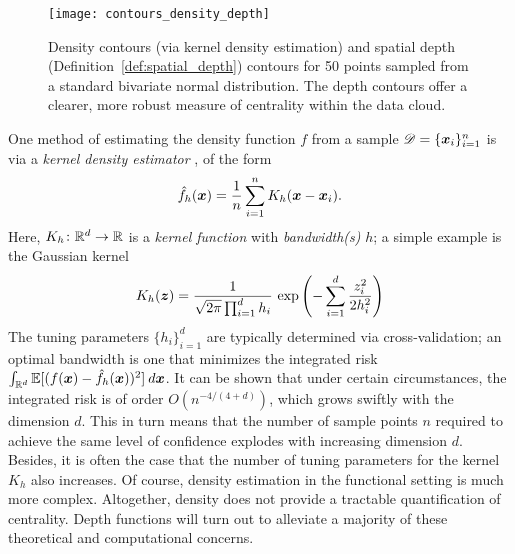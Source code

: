\begin{figure}
    \centering
    \texttt{[image: contours\_density\_depth]}
    \caption{
        Density contours (via kernel density estimation) and spatial depth
        (Definition~\ref{def:spatial_depth}) contours for 50 points sampled
        from a standard bivariate normal distribution.
        The depth contours offer a clearer, more robust measure of centrality
        within the data cloud.
    }
    \label{fig:contours_density_depth}
\end{figure}


One method of estimating the density function $f$ from a sample $\mathscr{D} =
\{\bm{x}_i\}_{i = 1}^n$ is via a \emph{kernel density estimator}
\parencite{wasserman-2005}, of the form
\begin{equation}
    \hat{f}_{h}(\bm{x}) = \frac{1}{n} \sum_{i = 1}^n K_h(\bm{x} - \bm{x}_i).
\end{equation}
Here, $K_h\colon \mathbb{R}^d \to \mathbb{R}$ is a \emph{kernel function} with
\emph{bandwidth(s)} $h$; a simple example is the Gaussian kernel
\begin{equation}
    K_h(\bm{z}) = \frac{1}{\sqrt{2\pi}\prod_{i = 1}^d h_i}\, \exp\left(-\sum_{i = 1}^d \frac{z_i^2}{2h_i^2}\right)
\end{equation}
The tuning parameters $\{h_i\}_{i = 1}^d$ are typically determined via
cross-validation; an optimal bandwidth is one that minimizes the integrated
risk $\int_{\mathbb{R}^d}\operatorname{\mathbb{E}}[(f(\bm{x}) - \hat{f}_h(\bm{x}))^2]\:d\bm{x}$.
It can be shown that under certain circumstances, the integrated risk is of
order $O(n^{-4/(4 + d)})$, which grows swiftly with the dimension $d$.
This in turn means that the number of sample points $n$ required to achieve
the same level of confidence explodes with increasing dimension $d$.
Besides, it is often the case that the number of tuning parameters for the
kernel $K_h$ also increases.
Of course, density estimation in the functional setting is much more complex.
Altogether, density does not provide a tractable quantification of centrality.
Depth functions will turn out to alleviate a majority of these theoretical and
computational concerns.


